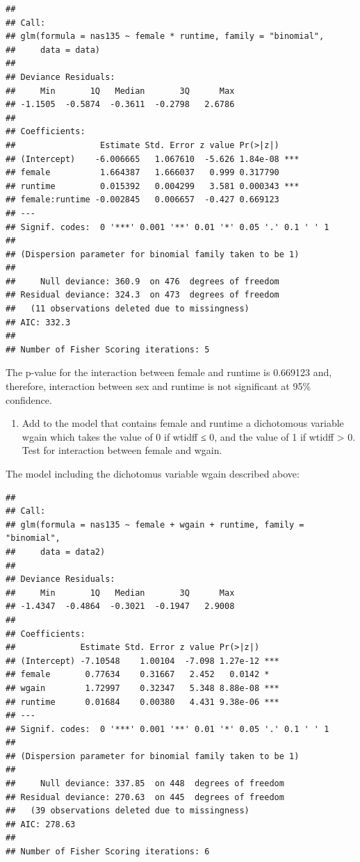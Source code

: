 \documentclass[]{article}
\begin{document}
\begin{verbatim}
## 
## Call:
## glm(formula = nas135 ~ female * runtime, family = "binomial", 
##     data = data)
## 
## Deviance Residuals: 
##     Min       1Q   Median       3Q      Max  
## -1.1505  -0.5874  -0.3611  -0.2798   2.6786  
## 
## Coefficients:
##                 Estimate Std. Error z value Pr(>|z|)    
## (Intercept)    -6.006665   1.067610  -5.626 1.84e-08 ***
## female          1.664387   1.666037   0.999 0.317790    
## runtime         0.015392   0.004299   3.581 0.000343 ***
## female:runtime -0.002845   0.006657  -0.427 0.669123    
## ---
## Signif. codes:  0 '***' 0.001 '**' 0.01 '*' 0.05 '.' 0.1 ' ' 1
## 
## (Dispersion parameter for binomial family taken to be 1)
## 
##     Null deviance: 360.9  on 476  degrees of freedom
## Residual deviance: 324.3  on 473  degrees of freedom
##   (11 observations deleted due to missingness)
## AIC: 332.3
## 
## Number of Fisher Scoring iterations: 5
\end{verbatim}

The p-value for the interaction between female and runtime is 0.669123
and, therefore, interaction between sex and runtime is not significant
at 95\% confidence.

\begin{enumerate}
\def\labelenumi{\alph{enumi}.}
\setcounter{enumi}{10}
\itemsep1pt\parskip0pt
\item
  Add to the model that contains female and runtime a dichotomous
  variable wgain which takes the value of 0 if wtidff ≤ 0, and the value
  of 1 if wtidff \textgreater{} 0. Test for interaction between female
  and wgain.
\end{enumerate}

The model including the dichotomus variable wgain described above:

\begin{verbatim}
## 
## Call:
## glm(formula = nas135 ~ female + wgain + runtime, family = "binomial", 
##     data = data2)
## 
## Deviance Residuals: 
##     Min       1Q   Median       3Q      Max  
## -1.4347  -0.4864  -0.3021  -0.1947   2.9008  
## 
## Coefficients:
##             Estimate Std. Error z value Pr(>|z|)    
## (Intercept) -7.10548    1.00104  -7.098 1.27e-12 ***
## female       0.77634    0.31667   2.452   0.0142 *  
## wgain        1.72997    0.32347   5.348 8.88e-08 ***
## runtime      0.01684    0.00380   4.431 9.38e-06 ***
## ---
## Signif. codes:  0 '***' 0.001 '**' 0.01 '*' 0.05 '.' 0.1 ' ' 1
## 
## (Dispersion parameter for binomial family taken to be 1)
## 
##     Null deviance: 337.85  on 448  degrees of freedom
## Residual deviance: 270.63  on 445  degrees of freedom
##   (39 observations deleted due to missingness)
## AIC: 278.63
## 
## Number of Fisher Scoring iterations: 6
\end{verbatim}
\end{document}
